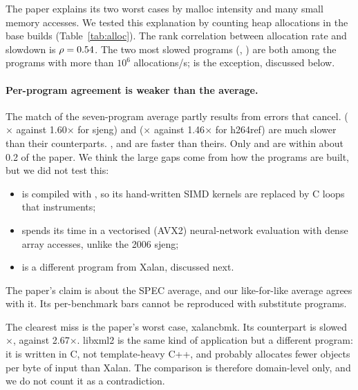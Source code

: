 The paper explains its two worst cases by malloc intensity and many small
memory accesses. We tested this explanation by counting heap allocations in
the base builds (Table~\ref{tab:alloc}). The rank correlation between
allocation rate and slowdown is $\rho=0.54$. The two most slowed
programs (, ) are both among the \NumHiAlloc{} programs
with more than $10^6$ allocations/s;  is the exception, discussed
below.

\paragraph{Per-program agreement is weaker than the average.}
The match of the seven-program average partly results from errors that
cancel.  (\RWStockfish$\times$ against 1.60$\times$ for sjeng)
and  (\RWX$\times$ against 1.46$\times$ for h264ref) are much slower
than their counterparts. ,  and  are faster
than theirs. Only  and  are within about 0.2 of the
paper. We think the large gaps come from how the programs are built, but we
did not test this:
\begin{itemize}
\item {} is compiled with , so its hand-written
SIMD kernels are replaced by C loops that \asan{} instruments;
\item {} spends its time in a vectorised (AVX2) neural-network
evaluation with dense array accesses, unlike the 2006 sjeng;
\item {} is a different program from Xalan, discussed next.
\end{itemize}
The paper's claim is about the SPEC average, and our like-for-like average
agrees with it. Its per-benchmark bars cannot be reproduced with substitute
programs.

The clearest miss is the paper's worst case, xalancbmk. Its counterpart
 is slowed \RWLibxml$\times$, against 2.67$\times$. libxml2 is the
same kind of application but a different program: it is written in C, not
template-heavy C++, and probably allocates fewer objects per byte of input
than Xalan. The comparison is therefore domain-level only, and we do not count
it as a contradiction.

\begin{table}[h]
\centering\small
\caption{Allocation profile of the base builds (,
) and slowdown (Table~\ref{tab:time}).}\label{tab:alloc}

\end{table}


